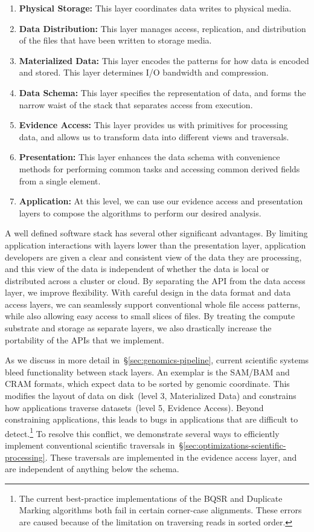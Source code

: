 \documentclass[10pt]{report} %
\begin{document}
\begin{enumerate}
\item {\bf Physical Storage:} This layer coordinates data writes to physical media.
\item {\bf Data Distribution:} This layer manages access, replication, and distribution of the files that have
been written to storage media.
\item {\bf Materialized Data:} This layer encodes the patterns for how data is encoded and stored. This
layer determines I/O bandwidth and compression.
\item {\bf Data Schema:} This layer specifies the representation of data, and forms the narrow waist of
the stack that separates access from execution.
\item {\bf Evidence Access:} This layer provides us with primitives for processing data, and allows us to
transform data into different views and traversals.
\item {\bf Presentation:} This layer enhances the data schema with convenience methods for performing
common tasks and accessing common derived fields from a single element.
\item {\bf Application:} At this level, we can use our evidence access and presentation layers to compose
the algorithms to perform our desired analysis.
\end{enumerate}

A well defined software stack has several other significant advantages. By limiting application
interactions with layers lower than the presentation layer, application developers are given a clear and
consistent view of the data they are processing, and this view of the data is independent of whether the
data is local or distributed across a cluster or cloud. By separating the API from the data access layer,
we improve flexibility. With careful design in the data format and data access layers, we can seamlessly
support conventional whole file access patterns, while also allowing easy access to small slices of files.
By treating the compute substrate and storage as separate layers, we also drastically increase
the portability of the APIs that we implement.

As we discuss in more detail in~\S\ref{sec:genomics-pipeline}, current scientific systems bleed
functionality between stack layers. An exemplar is the SAM/BAM and CRAM formats, which expect data
to be sorted by genomic coordinate. This modifies the layout of data on disk~(level 3, Materialized Data)
and constrains how applications traverse datasets~(level 5, Evidence Access). Beyond
constraining applications, this leads to bugs in applications that are difficult to detect.\footnote{The
current best-practice implementations of the BQSR and Duplicate Marking algorithms both fail in certain
corner-case alignments. These errors are caused because of the limitation on traversing reads in sorted
order.} To resolve this conflict, we demonstrate several ways to efficiently implement conventional scientific
traversals in~\S\ref{sec:optimizations-scientific-processing}. These traversals are implemented in the
evidence access layer, and are independent of anything below the schema.
\end{document}
